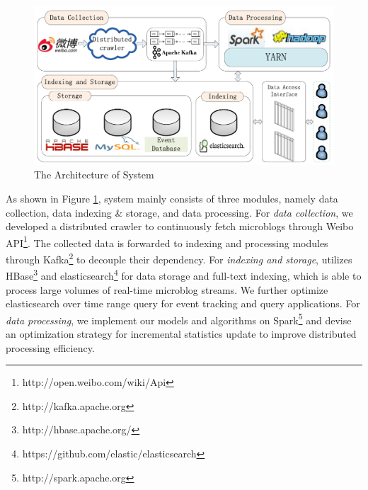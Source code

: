 

\begin{figure}[!t]
\centering
\includegraphics[scale=0.47]{system_architecture.pdf}
\centering
\caption{The Architecture of \ring System}
\label{fig:system_architecture}
\vspace{-3ex}
\end{figure}

As shown in Figure \ref{fig:system_architecture},
\ring system mainly consists of three modules, namely data collection, data indexing \& storage, and data processing.
For \emph{data collection}, we developed a distributed crawler to continuously fetch microblogs through Weibo API\footnote{http://open.weibo.com/wiki/Api}.
The collected data is forwarded to indexing and processing modules through Kafka\footnote{http://kafka.apache.org} to decouple their dependency.
For \emph{indexing and storage}, \ring utilizes HBase\footnote{http://hbase.apache.org/} and elasticsearch\footnote{https://github.com/elastic/elasticsearch} for data storage and full-text indexing, which is able to process large volumes of real-time microblog streams.
We further optimize elasticsearch over time range query for event tracking and query applications.
For \emph{data processing}, we implement our models and algorithms on Spark\footnote{http://spark.apache.org} and
 devise an optimization strategy for incremental statistics update to improve distributed processing efficiency.
